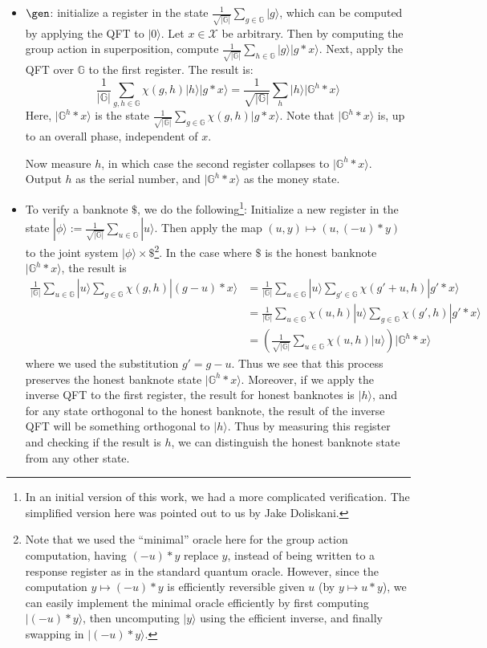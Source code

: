 \documentclass{article}\usepackage[a4paper,margin=20mm]{geometry}
\numberwithin{theorem}{section}
\numberwithin{equation}{section}
\newcommand{\G}{\mathbb{G}}
\newcommand{\Xs}{{\mathcal{X}}}
\begin{document}
\begin{itemize}
	\item $\gen$: initialize a register in the state $\frac{1}{\sqrt{|\G|}}\sum_{g\in\G}|g\rangle$, which can be computed by applying the QFT to $|0\rangle$. Let $x\in\Xs$ be arbitrary. Then by computing the group action in superposition, compute $\frac{1}{\sqrt{|\G|}}\sum_{h\in\G}|g\rangle|g*x\rangle$. Next, apply the QFT over $\G$ to the first register. The result is:
	\[\frac{1}{|\G|}\sum_{g,h\in\G} \chi(g,h)|h\rangle|g*x\rangle=\frac{1}{\sqrt{|\G|}}\sum_h |h\rangle|\G^h*x\rangle\]
	Here, $|\G^h*x\rangle$ is the state $\frac{1}{\sqrt{|\G|}}\sum_{g\in\G}\chi(g,h)|g*x\rangle$. Note that $|\G^h*x\rangle$ is, up to an overall phase, independent of $x$. 
	
	Now measure $h$, in which case the second register collapses to $|\G^h*x\rangle$. Output $h$ as the serial number, and $|\G^h*x\rangle$ as the money state.
	\item To verify a banknote $\$$, we do the following\footnote{In an initial version of this work, we had a more complicated verification. The simplified version here was pointed out to us by Jake Doliskani.}: Initialize a new register in the state $|\phi\rangle:=\frac{1}{\sqrt{|\G|}}\sum_{u\in\G}|u\rangle$. Then apply the map $(u,y)\mapsto(u,(-u)*y)$ to the joint system $|\phi\rangle\times \$$\enspace\footnote{Note that we used the ``minimal'' oracle here for the group action computation, having $(-u)*y$ replace $y$, instead of being written to a response register as in the standard quantum oracle. However, since the computation $y\mapsto (-u)*y$ is efficiently reversible given $u$ (by $y\mapsto u*y$), we can easily implement the minimal oracle efficiently by first computing $|(-u)*y\rangle$, then uncomputing $|y\rangle$ using the efficient inverse, and finally swapping in $|(-u)*y\rangle$.}. In the case where $\$$ is the honest banknote $|\G^h*x\rangle$, the result is
	\begin{align*}\frac{1}{|\G|}\sum_{u\in\G}|u\rangle \sum_{g\in\G}\chi(g,h)|(g-u)*x\rangle&=\frac{1}{|\G|}\sum_{u\in\G}|u\rangle \sum_{g'\in\G}\chi(g'+u,h)|g'*x\rangle\\&=\frac{1}{|\G|}\sum_{u\in\G}\chi(u,h)|u\rangle\sum_{g\in\G}\chi(g',h)|g'*x\rangle\\
		&=\left(\frac{1}{\sqrt{|\G|}}\sum_{u\in\G}\chi(u,h)|u\rangle\right)|\G^h*x\rangle\end{align*}
	where we used the substitution $g'=g-u$. Thus we see that this process preserves the honest banknote state $|\G^h*x\rangle$. Moreover, if we apply the inverse QFT to the first register, the result for honest banknotes is $|h\rangle$, and for any state orthogonal to the honest banknote, the result of the inverse QFT will be something orthogonal to $|h\rangle$. Thus by measuring this register and checking if the result is $h$, we can distinguish the honest banknote state from any other state.
\end{itemize}
\end{document}
